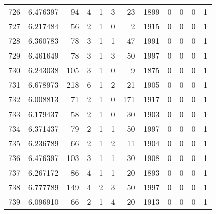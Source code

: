\begin{tabular}{lrrrrrrrrrrr}
726 &  6.476397 &   94 &      4 &        1 &      3 &              23 &  1899 &               0 &               0 &               0 &               1 \\
727 &  6.217484 &   56 &      2 &        1 &      0 &               2 &  1915 &               0 &               0 &               0 &               1 \\
728 &  6.360783 &   78 &      3 &        1 &      1 &              47 &  1991 &               0 &               0 &               0 &               1 \\
729 &  6.461649 &   78 &      3 &        1 &      3 &              50 &  1997 &               0 &               0 &               0 &               1 \\
730 &  6.243038 &  105 &      3 &        1 &      0 &               9 &  1875 &               0 &               0 &               0 &               1 \\
731 &  6.678973 &  218 &      6 &        1 &      2 &              21 &  1905 &               0 &               0 &               0 &               1 \\
732 &  6.008813 &   71 &      2 &        1 &      0 &             171 &  1917 &               0 &               0 &               0 &               1 \\
733 &  6.179437 &   58 &      2 &        1 &      0 &              30 &  1903 &               0 &               0 &               0 &               1 \\
734 &  6.371437 &   79 &      2 &        1 &      1 &              50 &  1997 &               0 &               0 &               0 &               1 \\
735 &  6.236789 &   66 &      2 &        1 &      2 &              11 &  1904 &               0 &               0 &               0 &               1 \\
736 &  6.476397 &  103 &      3 &        1 &      1 &              30 &  1908 &               0 &               0 &               0 &               1 \\
737 &  6.267172 &   86 &      4 &        1 &      1 &              20 &  1893 &               0 &               0 &               0 &               1 \\
738 &  6.777789 &  149 &      4 &        2 &      3 &              50 &  1997 &               0 &               0 &               0 &               1 \\
739 &  6.096910 &   66 &      2 &        1 &      4 &              20 &  1913 &               0 &               0 &               0 &               1 \\

\end{tabular}
